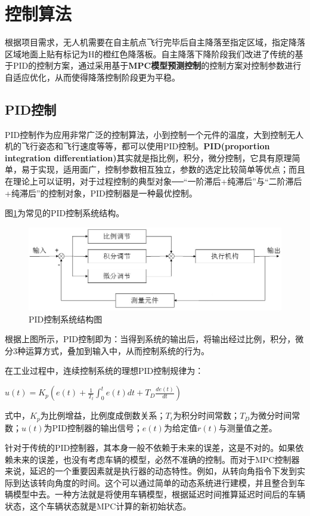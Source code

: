 \section{控制算法}

根据项目需求，无人机需要在自主航点飞行完毕后自主降落至指定区域，指定降落区域地面上贴有标记为H的橙红色降落板。自主降落下降阶段我们改进了传统的基于PID的控制方案，通过采用基于\textbf{MPC模型预测控制}的控制方案对控制参数进行自适应优化，从而使得降落控制阶段更为平稳。

\subsection{PID控制}

PID控制作为应用非常广泛的控制算法，小到控制一个元件的温度，大到控制无人机的飞行姿态和飞行速度等等，都可以使用PID控制。\textbf{PID(proportion integration differentiation)}其实就是指比例，积分，微分控制，它具有原理简单，易于实现，适用面广，控制参数相互独立，参数的选定比较简单等优点；而且在理论上可以证明，对于过程控制的典型对象──“一阶滞后+纯滞后”与“二阶滞后+纯滞后”的控制对象，PID控制器是一种最优控制\cite{ArtE2}。

图\ref{Fig:img4}为常见的PID控制系统结构。

\begin{figure}[ht]
  \centering
  \includegraphics[width=0.8\linewidth]{./Figure/PID_Graph.png}
  \caption{PID控制系统结构图}\label{Fig:img4}
\end{figure}

根据上图所示，PID控制即为：当得到系统的输出后，将输出经过比例，积分，微分3种运算方式，叠加到输入中，从而控制系统的行为。

在工业过程中，连续控制系统的理想PID控制规律为：

$u(t)=K_{p}\left(e(t)+\frac{1}{T_{t}} \int_{0}^{t} e(t) d t+T_{D} \frac{d e(t)}{d t}\right)$

式中，$K_{p}$为比例增益，比例度成倒数关系；$T_{t}$为积分时间常数；$T_{D}$为微分时间常数；$u(t)$为PID控制器的输出信号；$e(t)$为给定值$r(t)$与测量值之差。

针对于传统的PID控制器，其本身一般不依赖于未来的误差，这是不对的。如果依赖未来的误差，也没有考虑车辆的模型，必然不准确的控制。而对于MPC控制器来说，延迟的一个重要因素就是执行器的动态特性。例如，从转向角指令下发到实际到达该转向角度的时间。这个可以通过简单的动态系统进行建模，并且整合到车辆模型中去。一种方法就是将使用车辆模型，根据延迟时间推算延迟时间后的车辆状态，这个车辆状态就是MPC计算的新初始状态。\cite{ArtE10}

